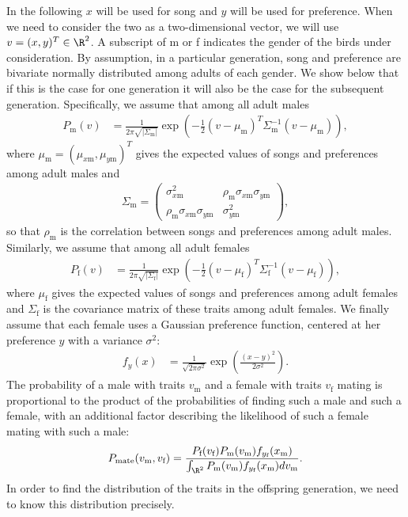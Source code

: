 \documentclass{article}
\newcommand{\x}[1]{\text{#1}}
\begin{document}
In the following $x$ will be used for song and $y$ will be used for preference. When we need to consider the two as a two-dimensional vector, we will use $v=(x,y)^T\in\R^2$. A subscript of m or f indicates the gender of the birds under consideration. By assumption, in a particular generation, song and preference are bivariate normally distributed among adults of each gender. We show below that if this is the case for one generation it will also be the case for the subsequent generation. Specifically, we assume that among all adult males
\begin{align*}
P_\x{m}(v)&=\frac{1}{2\pi\sqrt{|\Sigma_\x{m}|}}\exp\left(-\frac{1}{2}(v-\mu_\x{m})^T\Sigma_\x{m}^{-1}(v-\mu_\x{m})\right),
\end{align*} where $\mu_\x{m}=(\mu_{x\x{m}},\mu_{y\x{m}})^T$ gives the expected values of songs and preferences among adult males and 
\begin{align*}
\Sigma_{\x{m}}=\left(\begin{array}{cc}\sigma_{x\x{m}}^2 & \rho_\x{m}\sigma_{x\x{m}}\sigma_{y\x{m}} \\ \rho_\x{m}\sigma_{x\x{m}}\sigma_{y\x{m}} & \sigma_{y\x{m}}^2 \end{array}\right),
\end{align*}
so that $\rho_\x{m}$ is the correlation between songs and preferences among adult males. Similarly, we assume that among all adult females 
\begin{align*}
P_\x{f}(v)&=\frac{1}{2\pi\sqrt{|\Sigma_\x{f}|}}\exp\left(-\frac{1}{2}(v-\mu_\x{f})^T\Sigma_\x{f}^{-1}(v-\mu_\x{f})\right), 
\end{align*}
where $\mu_\x{f}$ gives the expected values of songs and preferences among adult females and $\Sigma_\x{f}$ is the covariance matrix of these traits among adult females. We finally assume that each female uses a Gaussian preference function, centered at her preference $y$ with a variance $\sigma^2$:
\begin{align*}
f_y(x)&=\frac{1}{\sqrt{2\pi\sigma^2}}\exp\left(\frac{(x-y)^2}{2\sigma^2}\right).
\end{align*}
The probability of a male with traits $v_\x{m}$ and a female with traits $v_\x{f}$ mating is proportional to the product of the probabilities of finding such a male and such a female, with an additional factor describing the likelihood of such a female mating with such a male:
\begin{equation} \label{model}
P_\x{mate}(v_\x{m},v_\x{f})=\frac{P_\x{f}(v_\x{f})P_\x{m}(v_\x{m})f_{y_\x{f}}(x_\x{m})}{\int_{\R^2} P_\x{m}(v_\x{m})f_{y_\x{f}}(x_\x{m})dv_\x{m} }.
\end{equation}
In order to find the distribution of the traits in the offspring generation, we need to know this distribution precisely.
\end{document}
